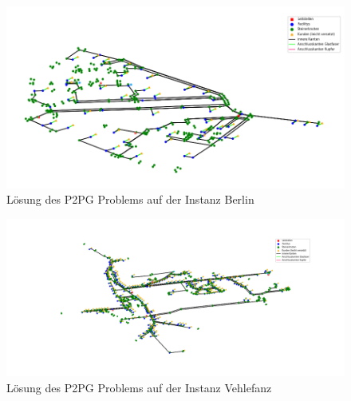 \documentclass[11pt,a4paper]{article}
\theoremstyle{my_th_style1}
\begin{document}
\begin{figure}[!htbp]
\begin{center}
	\begin{minipage}{15.0cm}
		\includegraphics[width=1\textwidth]{./Bilder/P2PG_Berlin}
		\caption{Lösung des P2PG Problems auf der Instanz Berlin}
		\label{p2pg b pic}
	\end{minipage}
\end{center}
\end{figure}

\begin{figure}[!htbp]
\begin{center}
	\begin{minipage}{15.0cm}
		\includegraphics[width=1\textwidth]{./Bilder/P2PG_Vehlefanz}
		\caption{Lösung des P2PG Problems auf der Instanz Vehlefanz}
		\label{p2pg v pic}
	\end{minipage}
\end{center}
\end{figure}
\end{document}

